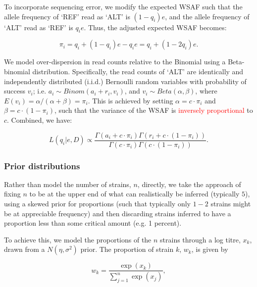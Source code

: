 \documentclass{bioinfo}
\newcounter{todocounter}
\newcommand{\done}[2][]
{\todo[color=green!40, #1]{#2}}
\newcommand{\donenum}[2][]
{\stepcounter{todocounter}\done[#1]{\thetodocounter: #2}}
\begin{document}

To incorporate sequencing error, we modify the expected WSAF such that the allele frequency of `REF' read as `ALT' is $(1 - q_i)e$, and the allele frequency of `ALT' read as `REF' is $q_ie$. Thus, the adjusted expected WSAF becomes:

\begin{equation}
\pi_i = q_i + (1 - q_i)e - q_ie = q_i + (1 - 2q_i)e.\label{eqn:adj_q}
\end{equation}

\noindent We model over-dispersion in read counts relative to the Binomial using a Beta-binomial distribution. Specifically, the read counts of `ALT' are identically and independently distributed (i.i.d.) Bernoulli random variables with probability of success $v_i$; i.e. $a_i \sim Binom(a_i + r_i, v_i)$, and $v_i \sim Beta(\alpha, \beta)$, where $E(v_i) = \alpha/(\alpha+\beta) = \pi_{i}$. This is achieved by setting $\alpha = c\cdot \pi_{i} $ and $\beta = c\cdot (1-\pi_{i})$, such that the variance of the WSAF is \textcolor{red}{inversely proportional} \donenum{REV3.6: sp inversley} to $c$. Combined, we have:

\begin{equation}
L(q_{i}| e, D) \propto \frac{\Gamma(a_i + c\cdot \pi_{i}) \Gamma(r_i + c\cdot (1-\pi_{i}))}{\Gamma(c\cdot \pi_{i})\Gamma(c\cdot (1-\pi_{i}))}. \label{eqn:llk}
\end{equation}


\subsubsection{Prior distributions}\label{sec:prior}

Rather than model the number of strains, $n$, directly, we take the approach of fixing $n$ to be at the upper end of what can realistically be inferred (typically $5$), using a skewed prior for proportions (such that typically only $1-2$ strains might be at appreciable frequency) and then discarding strains inferred to have a proportion less than some critical amount (e.g. 1 percent).

To achieve this, we model the proportions of the $n$ strains through a log titre, $x_k$, drawn from a $N(\eta, \sigma^2)$ prior.  The proportion of strain $k$, $w_k$, is given by

\begin{equation}
w_k = \frac{\exp(x_k)}{\sum_{j=1}^n \exp(x_j)},
\end{equation}
\end{document}
